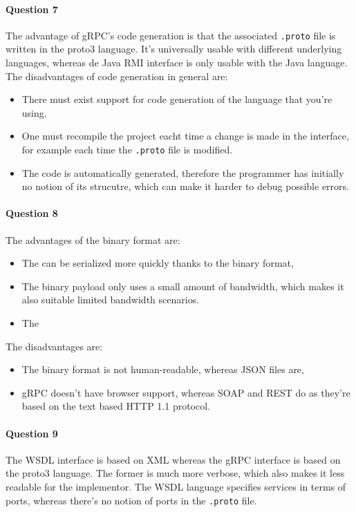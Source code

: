 \documentclass{ds-report}
\begin{document}
	\paragraph{Question 7}
	The advantage of gRPC's code generation is that the associated \texttt{.proto} file is written in the proto3 language. It's universally usable with different underlying languages, whereas de Java RMI interface is only usable with the Java language.
	The disadvantages of code generation in general are:
	\begin{itemize}
		\item There must exist support for code generation of the language that you're using.
		\item One must recompile the project eacht time a change is made in the interface, for example each time the \texttt{.proto} file is modified.
		\item The code is automatically generated, therefore the programmer has initially no notion of its strucutre, which can make it harder to debug possible errors.
	\end{itemize}

	\paragraph{Question 8}
	The advantages of the binary format are:
	\begin{itemize}
		\item The can be serialized more quickly thanks to the binary format,
		\item The binary payload only uses a small amount of bandwidth, which makes it also suitable limited bandwidth scenarios.
		\item The 
	\end{itemize}
	The disadvantages are:
	\begin{itemize}
		\item The binary format is not human-readable, whereas JSON files are,
		\item gRPC doesn't have browser support, whereas SOAP and REST do as they're based on the text based HTTP 1.1 protocol.
	\end{itemize}
	
	\paragraph{Question 9}
	The WSDL interface is based on XML whereas the gRPC interface is based on the proto3 language. The former is much more verbose, which also makes it less readable for the implementor. The WSDL language specifies services in terms of ports, whereas there's no notion of ports in the \texttt{.proto} file. 
	
\end{document}
